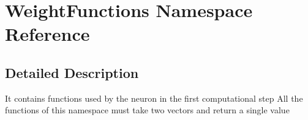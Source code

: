 \hypertarget{namespace_weight_functions}{\section{Weight\-Functions Namespace Reference}
\label{namespace_weight_functions}
}


\subsection{Detailed Description}
It contains functions used by the neuron in the first computational step All the functions of this namespace must take two vectors and return a single value 